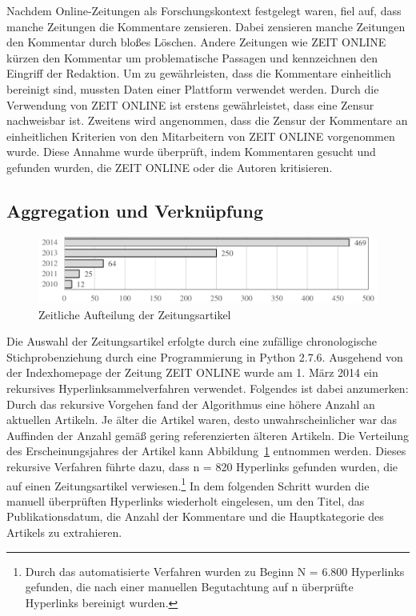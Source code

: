 \documentclass[12pt,a4paper,oneside]{article}
\begin{document}
\begin{titlepage}
\begin{flushleft}
Nachdem Online-Zeitungen als Forschungskontext festgelegt waren, fiel auf, dass manche Zeitungen die Kommentare zensieren. Dabei zensieren manche Zeitungen den Kommentar durch bloßes Löschen. Andere Zeitungen wie ZEIT ONLINE kürzen den Kommentar um problematische Passagen und kennzeichnen den Eingriff der Redaktion. Um zu gewährleisten, dass die Kommentare einheitlich bereinigt sind, mussten Daten einer Plattform verwendet werden. Durch die Verwendung von ZEIT ONLINE ist erstens gewährleistet, dass eine Zensur nachweisbar ist. Zweitens wird angenommen, dass die Zensur der Kommentare an einheitlichen Kriterien von den Mitarbeitern von ZEIT ONLINE vorgenommen wurde. Diese Annahme wurde überprüft, indem Kommentaren gesucht und gefunden wurden, die ZEIT ONLINE oder die Autoren kritisieren.

\subsection{Aggregation und Verknüpfung}

\begin{figure}[h!]
\includegraphics[width=.90\textwidth]{crawl-Zeit1-sicherhheit_cropped.pdf}
\caption{Zeitliche Aufteilung der Zeitungsartikel}
\label{fig:url-found}
\end{figure}

Die Auswahl der Zeitungsartikel erfolgte durch eine zufällige chronologische Stichprobenziehung durch eine Programmierung in Python 2.7.6. Ausgehend von der Indexhomepage der Zeitung ZEIT ONLINE wurde am 1. März 2014 ein rekursives Hyperlinksammelverfahren verwendet. Folgendes ist dabei anzumerken: Durch das rekursive Vorgehen fand der Algorithmus eine höhere Anzahl an aktuellen Artikeln. Je älter die Artikel waren, desto unwahrscheinlicher war das Auffinden der Anzahl gemäß gering referenzierten älteren Artikeln. Die Verteilung des Erscheinungsjahres der Artikel kann Abbildung~\ref{fig:url-found} entnommen werden. Dieses rekursive Verfahren führte dazu, dass n = 820 Hyperlinks gefunden wurden, die auf einen Zeitungsartikel verwiesen.\footnote{Durch das automatisierte Verfahren wurden zu Beginn N = 6.800 Hyperlinks gefunden, die nach einer manuellen Begutachtung auf n überprüfte Hyperlinks bereinigt wurden.} In dem folgenden Schritt wurden die manuell überprüften Hyperlinks wiederholt eingelesen, um den Titel, das Publikationsdatum, die Anzahl der Kommentare und die Hauptkategorie des Artikels zu extrahieren. 


\end{flushleft}
\end{titlepage}
\end{document}
